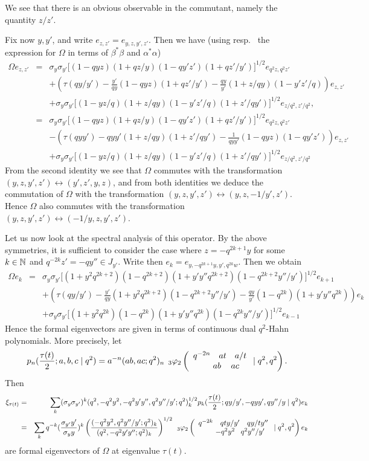 We see that there is an obvious observable in the commutant, namely the quantity $z/z'$. 

Fix now $y,y'$, and write $e_{z,z'} = e_{y,z,y',z'}$. Then we have (using resp.~ the expression for $\Omega$ in terms of $\beta^*\beta$ and $\alpha^*\alpha$) \begin{eqnarray*} \Omega  e_{z,z'} &=& \sigma_{y}\sigma_{y'} \lbrack (1-qyz)(1+qz/y)(1-qy'z')(1+qz'/y')\rbrack^{1/2} e_{q^2z,q^2z'} \\ && + \left( \tau(qy/y')- \frac{y'}{qy}(1-qyz)(1+qz'/y') -\frac{qy}{y'}(1+z/qy)(1-y'z'/q)\right) e_{z,z'} \\ && +\sigma_{y}\sigma_{y'}\lbrack (1-yz/q)(1+z/qy)(1-y'z'/q)(1+z'/qy')\rbrack^{1/2} e_{z/q^2,z'/q^2},\\
 &=& \sigma_y\sigma_{y'}\lbrack (1-qyz)(1+qz/y)(1 -qy'z')(1+qz'/y')\rbrack^{1/2} e_{q^2z,q^2z'} \\  &&-\left(\tau(qyy') - qyy'(1+z/qy)(1+z'/qy') -  \frac{1}{qyy'}(1-qyz)(1 -qy'z')\right) e_{z,z'} \\ &&+ \sigma_y\sigma_{y'}\lbrack (1-yz/q)(1+z/qy)(1 -y'z'/q)(1+z'/qy')\rbrack^{1/2}e_{z/q^2,z'/q^2}
\end{eqnarray*}
From the second identity we see that $\Omega$ commutes with the transformation $(y,z,y',z')\leftrightarrow (y',z',y,z)$, and from both identities we deduce the commutation of $\Omega$ with the transformation $(y,z,y',z')\leftrightarrow (y,z,-1/y',z')$. Hence $\Omega$ also commutes with the transformation $(y,z,y',z')\leftrightarrow (-1/y,z,y',z')$. 


Let us now look at the spectral analysis of this operator. By the above symmetries, it is sufficient to consider the case where $z = -q^{2k+1}y$ for some $k\in \mathbb{N}$ and $q^{-2k}z' = -qy'' \in J_{y'}$. Write then $e_k = e_{y,-q^{2k+1}y,y',q^{2k}w}$. Then we obtain   \begin{eqnarray*} \Omega  e_{k} &=& \sigma_{y}\sigma_{y'} \lbrack (1+y^2q^{2k+2})(1-q^{2k+2})(1+y'y'' q^{2k+2})(1-q^{2k+2}y''/y')\rbrack^{1/2} e_{k+1} \\ && + \left( \tau(qy/y')- \frac{y'}{qy}(1+y^2q^{2k+2})(1-q^{2k+2}y''/y') -\frac{qy}{y'}(1-q^{2k})(1+y'y''q^{2k})\right) e_{k} \\ && +\sigma_{y}\sigma_{y'}\lbrack (1+y^2q^{2k})(1-q^{2k})(1+y'y''q^{2k})(1-q^{2k}y''/y')\rbrack^{1/2} e_{k-1}\end{eqnarray*} Hence the formal eigenvectors are given in terms of continuous dual $q^2$-Hahn polynomials. More precisely, let \[ p_n(\frac{\tau(t)}{2};a,b,c\mid q^2) = a^{-n}(ab,ac;q^2)_n \qortb{q^{-2n}}{at}{a/t}{ab}{ac}{q^2}{q^2}.\] Then \begin{eqnarray*} \xi_{\tau(t)} &=& \sum_k  (\sigma_y\sigma_{y'})^k (q^2,-q^2y^2,-q^2y'y'',q^2y''/y';q^2)_k^{1/2} p_k(\frac{\tau(t)}{2};qy/y',-qyy',qy''/y\mid q^2)   e_k \\
&=& \sum_k q^{-k}  (\frac{\sigma_{y'}y'}{\sigma_y y})^k  \left(\frac{(-q^2y^2,q^2y''/y';q^2)_k}{(q^2,-q^2y'y'';q^2)_k}\right)^{1/2}
   \qortb{q^{-2k}}{qty/y'}{qy/ty''}{-q^2y^2}{q^2y''/y'}{q^2}{q^2} e_k
\end{eqnarray*} are formal eigenvectors of $\Omega$ at eigenvalue $\tau(t)$. 




